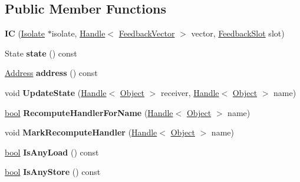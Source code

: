 \subsection*{Public Member Functions}
\begin{DoxyCompactItemize}
\item 
\mbox{\label{classv8_1_1internal_1_1IC_ae6e2bab1fc3f1fba4815a99b1f306c8d}} 
{\bfseries IC} (\mbox{\hyperlink{classv8_1_1internal_1_1Isolate}{Isolate}} $\ast$isolate, \mbox{\hyperlink{classv8_1_1internal_1_1Handle}{Handle}}$<$ \mbox{\hyperlink{classv8_1_1internal_1_1FeedbackVector}{Feedback\+Vector}} $>$ vector, \mbox{\hyperlink{classv8_1_1internal_1_1FeedbackSlot}{Feedback\+Slot}} slot)
\item 
\mbox{\label{classv8_1_1internal_1_1IC_a44761904b47f546a821e76605ba889df}} 
State {\bfseries state} () const
\item 
\mbox{\label{classv8_1_1internal_1_1IC_ac39f7749198dfeda1c9afbaa55a64b24}} 
\mbox{\hyperlink{classuintptr__t}{Address}} {\bfseries address} () const
\item 
\mbox{\label{classv8_1_1internal_1_1IC_a50579cded027ba2f7e5396ca5e3ad400}} 
void {\bfseries Update\+State} (\mbox{\hyperlink{classv8_1_1internal_1_1Handle}{Handle}}$<$ \mbox{\hyperlink{classv8_1_1internal_1_1Object}{Object}} $>$ receiver, \mbox{\hyperlink{classv8_1_1internal_1_1Handle}{Handle}}$<$ \mbox{\hyperlink{classv8_1_1internal_1_1Object}{Object}} $>$ name)
\item 
\mbox{\label{classv8_1_1internal_1_1IC_ae3912e99b7c08c6dc9851985767afe71}} 
\mbox{\hyperlink{classbool}{bool}} {\bfseries Recompute\+Handler\+For\+Name} (\mbox{\hyperlink{classv8_1_1internal_1_1Handle}{Handle}}$<$ \mbox{\hyperlink{classv8_1_1internal_1_1Object}{Object}} $>$ name)
\item 
\mbox{\label{classv8_1_1internal_1_1IC_a4458ef77a18b34013ce04d0baea9de39}} 
void {\bfseries Mark\+Recompute\+Handler} (\mbox{\hyperlink{classv8_1_1internal_1_1Handle}{Handle}}$<$ \mbox{\hyperlink{classv8_1_1internal_1_1Object}{Object}} $>$ name)
\item 
\mbox{\label{classv8_1_1internal_1_1IC_abd135f9d55b4c3b7ca77ff960159f704}} 
\mbox{\hyperlink{classbool}{bool}} {\bfseries Is\+Any\+Load} () const
\item 
\mbox{\label{classv8_1_1internal_1_1IC_a64f78feb5543ca5ee45209e1b853f902}} 
\mbox{\hyperlink{classbool}{bool}} {\bfseries Is\+Any\+Store} () const
\end{DoxyCompactItemize}
